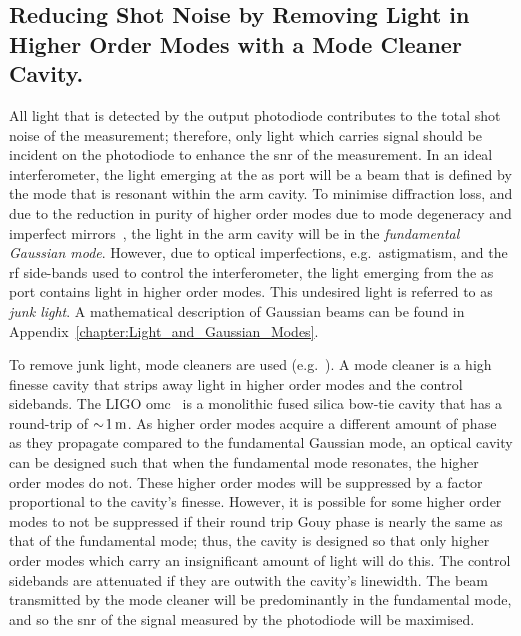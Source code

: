 \subsection{Reducing Shot Noise by Removing Light in Higher Order Modes with a Mode Cleaner Cavity.}
\label{sec:detector_chapter_OMC}
All light that is detected by the output photodiode contributes to the total shot noise of the measurement; therefore, only light which carries signal should be incident on the photodiode to enhance the \gls{snr} of the measurement. In an ideal interferometer, the light emerging at the \gls{as} port will be a beam that is defined by the mode that is resonant within the arm cavity. To minimise diffraction loss, and due to the reduction in purity of higher order modes due to mode degeneracy and imperfect mirrors~\cite{Sorazu2013}, the light in the arm cavity will be in the \emph{fundamental Gaussian mode}. However, due to optical imperfections, e.g.~astigmatism, and the \gls{rf} side-bands used to control the interferometer, the light emerging from the \gls{as} port contains light in higher order modes. This undesired light is referred to as \emph{junk light}. A mathematical description of Gaussian beams can be found in Appendix~\ref{chapter:Light_and_Gaussian_Modes}.
\par
To remove junk light, mode cleaners are used (e.g.~\cite{OMC_ligo,Prijatelj2012}). A mode cleaner is a high finesse cavity that strips away light in higher order modes and the control sidebands. The LIGO \gls{omc}~\cite{OMC_ligo} is a monolithic fused silica bow-tie cavity that has a round-trip of $\sim\!1\,\rm{m}$. As higher order modes acquire a different amount of phase as they propagate compared to the fundamental Gaussian mode, an optical cavity can be designed such that when the fundamental mode resonates, the higher order modes do not. These higher order modes will be suppressed by a factor proportional to the cavity's finesse. However, it is possible for some higher order modes to not be suppressed if their round trip Gouy phase is nearly the same as that of the fundamental mode; thus, the cavity is designed so that only higher order modes which carry an insignificant amount of light will do this. The control sidebands are attenuated if they are outwith the cavity's linewidth. The beam transmitted by the mode cleaner will be predominantly in the fundamental mode, and so the \gls{snr} of the signal measured by the photodiode will be maximised. 
